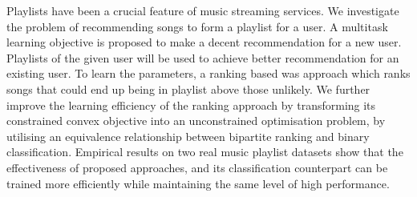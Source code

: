 Playlists have been a crucial feature of music streaming services.
We investigate the problem of recommending songs to form a playlist for a user.
A multitask learning objective is proposed to make a decent recommendation for a new user.
Playlists of the given user will be used to achieve better recommendation for an existing user.
To learn the parameters, a ranking based was approach which ranks songs that could end up being 
in playlist above those unlikely.
We further improve the learning efficiency of the ranking approach by transforming its
constrained convex objective into an unconstrained optimisation problem,
by utilising an equivalence relationship between bipartite ranking and binary classification.
Empirical results on two real music playlist datasets show that the effectiveness of proposed approaches,
and its classification counterpart can be trained more efficiently while maintaining the same level of high performance.
